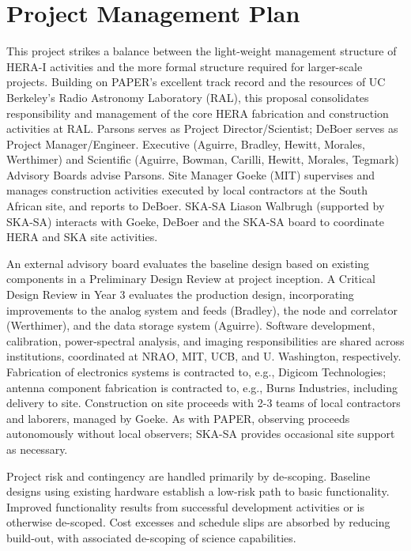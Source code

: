 \documentclass[preprint]{aastex}
\begin{document}
\section{Project Management Plan}

This project strikes a balance between the light-weight
management structure of HERA-I activities and the more formal structure
required for larger-scale projects.  Building on PAPER's excellent track record
and the resources of UC Berkeley's Radio Astronomy Laboratory (RAL),
this proposal consolidates responsibility and management of the core HERA
fabrication and construction activities at RAL. Parsons serves as
Project Director/Scientist; DeBoer serves as Project Manager/Engineer.
Executive 
(Aguirre, Bradley, Hewitt, Morales, Werthimer) 
and Scientific (Aguirre, Bowman, Carilli, Hewitt, Morales, Tegmark) Advisory Boards advise Parsons.
Site Manager Goeke (MIT) supervises and manages
construction activities executed by local contractors at the South African
site, and reports to DeBoer.  SKA-SA Liason Walbrugh (supported by SKA-SA)
interacts with Goeke, DeBoer and the SKA-SA board to
coordinate HERA and SKA site activities.

An external advisory board evaluates the baseline design 
based on existing components in a Preliminary Design Review at project inception.
A Critical Design Review in Year 3 evaluates the 
production design, incorporating improvements to the analog system
and feeds (Bradley), the node and correlator (Werthimer), and the data storage
system (Aguirre).
Software development, calibration, power-spectral analysis, and imaging responsibilities 
are shared across institutions, coordinated at NRAO, MIT, UCB, and U. Washington,
respectively.
Fabrication of electronics systems 
is contracted to, e.g., Digicom Technologies; antenna
component fabrication is contracted to, e.g., Burns Industries, 
including delivery to site.  Construction on site proceeds
with 2-3 teams of local contractors and laborers, managed by Goeke.  As with
PAPER, observing proceeds autonomously without local observers; SKA-SA
provides occasional site support as necessary.

Project risk and contingency are handled primarily by de-scoping.  Baseline designs using
existing hardware establish a low-risk path to basic functionality.  Improved functionality
results from successful development activities or is otherwise de-scoped.
Cost excesses and schedule slips are absorbed by reducing
build-out, with associated de-scoping of science capabilities.
\end{document}

